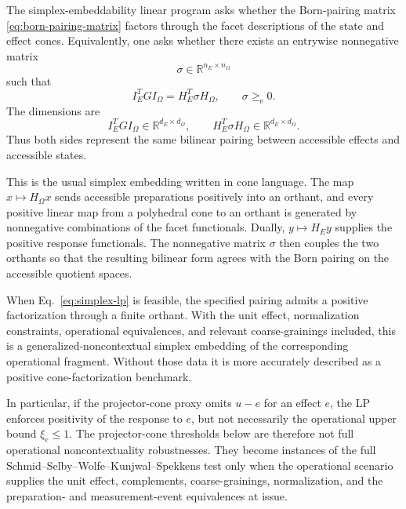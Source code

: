 \documentclass[aps,pra,twocolumn,superscriptaddress,nofootinbib]{revtex4-2}
\newcommand{\reals}{\mathbb{R}}
\begin{document}
The simplex-embeddability linear program asks whether the Born-pairing matrix
\eqref{eq:born-pairing-matrix} factors through the facet descriptions of the
state and effect cones.  Equivalently, one asks whether there exists an
entrywise nonnegative matrix
\begin{equation}
        \sigma\in\reals^{n_E\times n_\Omega}
\end{equation}
such that
\begin{equation}
        I_E^T G I_\Omega
        =
        H_E^T\sigma H_\Omega,
        \qquad
        \sigma\ge_{\mathrm e}0.
        \label{eq:simplex-lp}
\end{equation}
The dimensions are
\begin{equation}
        I_E^T G I_\Omega\in\reals^{d_E\times d_\Omega},
        \qquad
        H_E^T\sigma H_\Omega\in\reals^{d_E\times d_\Omega}.
\end{equation}
Thus both sides represent the same bilinear pairing between accessible effects
and accessible states.

This is the usual simplex embedding written in cone language.  The map
\(x\mapsto H_\Omega x\) sends accessible preparations positively into an
orthant, and every positive linear map from a polyhedral cone to an orthant is
generated by nonnegative combinations of the facet functionals.  Dually,
\(y\mapsto H_E y\) supplies the positive response functionals.  The
nonnegative matrix \(\sigma\) then couples the two orthants so that the
resulting bilinear form agrees with the Born pairing on the accessible
quotient spaces.

When Eq.~\eqref{eq:simplex-lp} is feasible, the specified pairing admits a
positive factorization through a finite orthant.  With the unit effect,
normalization constraints, operational equivalences, and relevant
coarse-grainings included, this is a generalized-noncontextual simplex
embedding of the corresponding operational fragment.  Without those data it
is more accurately described as a positive cone-factorization benchmark.

In particular, if the projector-cone proxy omits \(u-e\) for an effect \(e\),
the LP enforces positivity of the response to \(e\), but not necessarily the
operational upper bound \(\xi_e\leq1\).  The projector-cone thresholds below
are therefore not full operational noncontextuality robustnesses.  They become
instances of the full Schmid--Selby--Wolfe--Kunjwal--Spekkens test only when the
operational scenario supplies the unit effect, complements, coarse-grainings,
normalization, and the preparation- and measurement-event equivalences at
issue.
\end{document}
